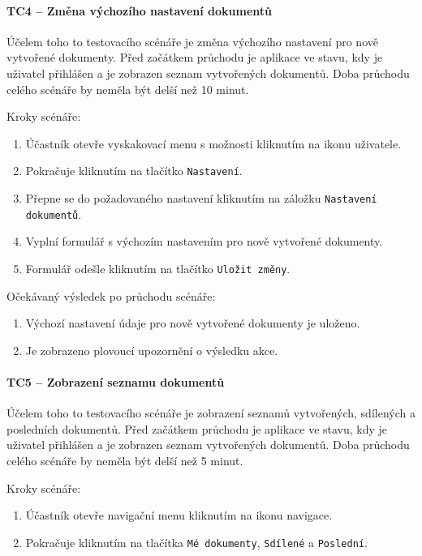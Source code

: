 \paragraph{TC4 -- Změna výchozího nastavení dokumentů}

Účelem toho to testovacího scénáře je změna výchozího nastavení pro nově vytvořené dokumenty.
Před začátkem průchodu je aplikace ve stavu, kdy je uživatel přihlášen a je zobrazen seznam vytvořených dokumentů.
Doba průchodu celého scénáře by neměla být delší než 10 minut.

Kroky scénáře:
\begin{enumerate}
    \item Účastník otevře vyskakovací menu s možnosti kliknutím na ikonu uživatele.
    \item Pokračuje kliknutím na tlačítko \texttt{Nastavení}.
    \item Přepne se do požadovaného nastavení kliknutím na záložku \texttt{Nastavení dokumentů}.
    \item Vyplní formulář s výchozím nastavením pro nově vytvořené dokumenty.
    \item Formulář odešle kliknutím na tlačítko \texttt{Uložit změny}.
\end{enumerate}

Očekávaný výsledek po průchodu scénáře:
\begin{enumerate}
    \item Výchozí nastavení údaje pro nově vytvořené dokumenty je uloženo.
    \item Je zobrazeno plovoucí upozornění o výsledku akce.
\end{enumerate}


\paragraph{TC5 -- Zobrazení seznamu dokumentů}

Účelem toho to testovacího scénáře je zobrazení seznamů vytvořených, sdílených a posledních dokumentů.
Před začátkem průchodu je aplikace ve stavu, kdy je uživatel přihlášen a je zobrazen seznam vytvořených dokumentů.
Doba průchodu celého scénáře by neměla být delší než 5 minut.

Kroky scénáře:
\begin{enumerate}
    \item Účastník otevře navigační menu kliknutím na ikonu navigace.
    \item Pokračuje kliknutím na tlačítka \texttt{Mé dokumenty}, \texttt{Sdílené} a \texttt{Poslední}.
\end{enumerate}

